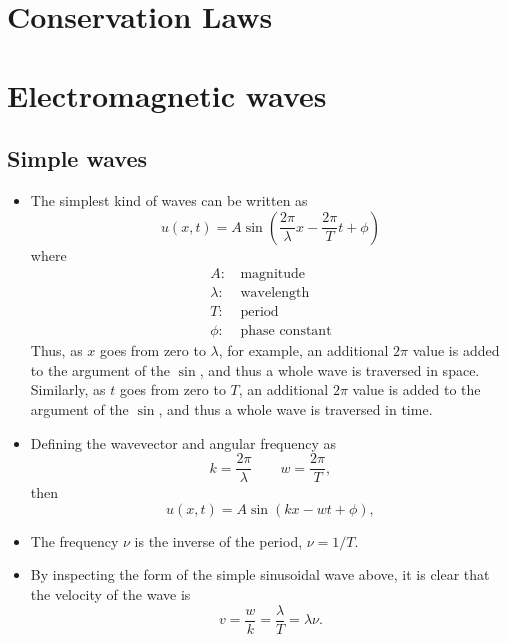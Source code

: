 \documentclass[oneside,a4paper,11pt]{report}
\begin{document}
\section{Conservation Laws}

\section{Electromagnetic waves}

\subsection{Simple waves}
\begin{itemize}
\item The simplest kind of waves can be written as
\begin{equation}
    u(x,t) = A \sin\left ( \frac{2 \pi}{\lambda}x - \frac{2 \pi}{T} t +\phi \right)
\end{equation}
where
\begin{align*}
    A:&\, \text{magnitude} \\
    \lambda:&\, \text{wavelength} \\
    T:&\, \text{period} \\
    \phi:&\, \text{phase constant}
\end{align*}
Thus, as $x$ goes from zero to $\lambda$, for example, an additional $2\pi$ value is added to the argument of the $\sin$, and thus a whole wave is traversed in space. Similarly, as $t$ goes from zero to $T$, an additional $2\pi$ value is added to the argument of the $\sin$, and thus a whole wave is traversed in time.

\item Defining the wavevector and angular frequency as
\begin{equation}
    k = \frac{2 \pi}{\lambda} \qquad w = \frac{2 \pi}{T},
\end{equation}
then
\begin{equation}
    u(x,t) = A \sin(kx - wt + \phi),
\end{equation}

\item The frequency $\nu$ is the inverse of the period, $\nu = 1/T$.

\item By inspecting the form of the simple sinusoidal wave above, it is clear that the velocity of the wave is
\begin{equation}
    v = \frac{w}{k} = \frac{\lambda}{T} = \lambda \nu.
\end{equation}
\end{itemize}
\end{document}
